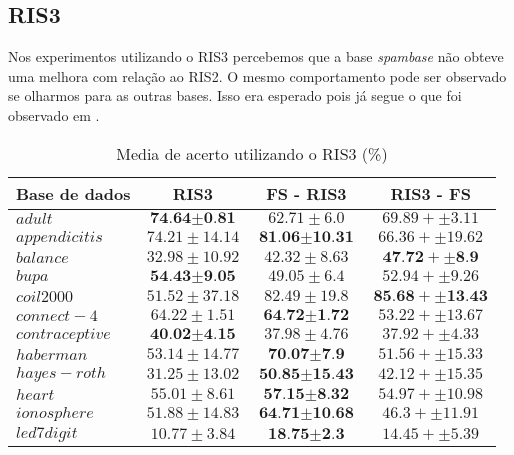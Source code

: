\documentclass[a4paper, 12pt]{article}
\begin{document}
\subsection{RIS3}
Nos experimentos utilizando o RIS3 percebemos que a base \textit{spambase} não obteve uma melhora com relação ao RIS2. O mesmo comportamento pode ser observado se olharmos para as outras bases. Isso era esperado pois já segue o que foi observado em \cite{ris}.
\begin{table}[h!]
  \begin{center}
    \caption{Media de acerto utilizando o RIS3 (\%)}
    \label{tab:table7}
    \begin{tabular}{l|c|c|c}
      \textbf{Base de dados} & \textbf{ RIS3 } & \textbf{FS - RIS3} & \textbf{RIS3 - FS}\\
        \hline
        $adult$ & $\textbf{74.64} \pm \textbf{0.81}$  & $62.71 \pm 6.0$ & $69.89 +  \pm 3.11$ \\
        \hline
        $appendicitis$ & $74.21 \pm 14.14$  & $\textbf{81.06} \pm \textbf{10.31}$ & $66.36 +  \pm 19.62$ \\
        \hline
        $balance$ & $32.98 \pm 10.92$  & $42.32 \pm 8.63$ & $\textbf{47.72} +  \pm \textbf{8.9}$ \\
        \hline
        $bupa$ & $\textbf{54.43} \pm \textbf{9.05}$  & $49.05 \pm 6.4$ & $52.94 +  \pm 9.26$ \\
        \hline
        $coil2000$ & $51.52 \pm 37.18$  & $82.49 \pm 19.8$ & $\textbf{85.68} +  \pm \textbf{13.43}$ \\
        \hline
        $connect-4$ & $64.22 \pm 1.51$  & $\textbf{64.72} \pm \textbf{1.72}$ & $53.22 +  \pm 13.67$ \\
        \hline
        $contraceptive$ & $\textbf{40.02} \pm \textbf{4.15}$  & $37.98 \pm 4.76$ & $37.92 +  \pm 4.33$ \\
        \hline
        $haberman$ & $53.14 \pm 14.77$  & $\textbf{70.07} \pm \textbf{7.9}$ & $51.56 +  \pm 15.33$ \\
        \hline
        $hayes-roth$ & $31.25 \pm 13.02$  & $\textbf{50.85} \pm \textbf{15.43}$ & $42.12 +  \pm 15.35$ \\
        \hline
        $heart$ & $55.01 \pm 8.61$  & $\textbf{57.15} \pm \textbf{8.32}$ & $54.97 +  \pm 10.98$ \\
        \hline
        $ionosphere$ & $51.88 \pm 14.83$  & $\textbf{64.71} \pm \textbf{10.68}$ & $46.3 +  \pm 11.91$ \\
        \hline
        $led7digit$ & $10.77 \pm 3.84$  & $\textbf{18.75} \pm \textbf{2.3}$ & $14.45 +  \pm 5.39$ \\

\end{tabular}
\end{center}
\end{table}
\end{document}

